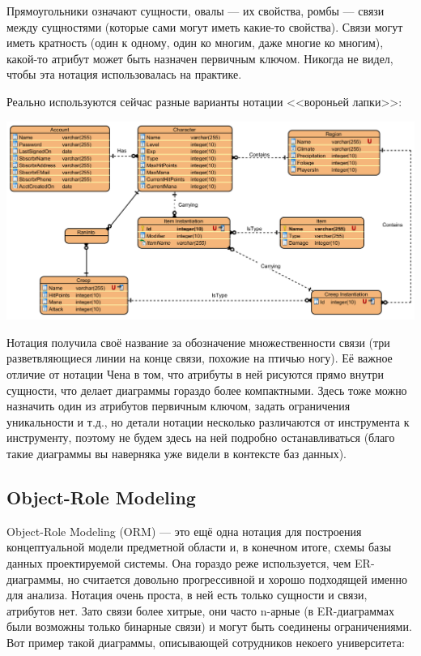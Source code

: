\documentclass{../../text-style}
\begin{document}
Прямоугольники означают сущности, овалы --- их свойства, ромбы --- связи между сущностями (которые сами могут иметь какие-то свойства). Связи могут иметь кратность (один к одному, один ко многим, даже многие ко многим), какой-то атрибут может быть назначен первичным ключом. Никогда не видел, чтобы эта нотация использовалась на практике.

Реально используются сейчас разные варианты нотации <<вороньей лапки>>:

\begin{center}
    \includegraphics[width=\textwidth]{erCrowsFoot.png}
\end{center}

Нотация получила своё название за обозначение множественности связи (три разветвляющиеся линии на конце связи, похожие на птичью ногу). Её важное отличие от нотации Чена в том, что атрибуты в ней рисуются прямо внутри сущности, что делает диаграммы гораздо более компактными. Здесь тоже можно назначить один из атрибутов первичным ключом, задать ограничения уникальности и т.д., но детали нотации несколько различаются от инструмента к инструменту, поэтому не будем здесь на ней подробно останавливаться (благо такие диаграммы вы наверняка уже видели в контексте баз данных).

\subsection{Object-Role Modeling}

Object-Role Modeling (ORM) --- это ещё одна нотация для построения концептуальной модели предметной области и, в конечном итоге, схемы базы данных проектируемой системы. Она гораздо реже используется, чем ER-диаграммы, но считается довольно прогрессивной и хорошо подходящей именно для анализа. Нотация очень проста, в ней есть только сущности и связи, атрибутов нет. Зато связи более хитрые, они часто n-арные (в ER-диаграммах были возможны только бинарные связи) и могут быть соединены ограничениями. Вот пример такой диаграммы, описывающей сотрудников некоего университета:
\end{document}
